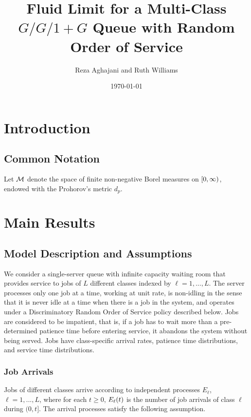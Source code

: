 \documentclass{article}
\theoremstyle{definition}
\numberwithin{equation}{section}
\begin{document}
\title{Fluid Limit for a Multi-Class $G/G/1+G$ Queue with Random Order of Service}
\date{\today}
\author{Reza Aghajani and Ruth Williams}

\maketitle

\tableofcontents


\section{Introduction}\label{sec_intro}

\subsection{Common Notation} \label{sec_notation}

Let $\mathcal{M}$ denote the space of finite non-negative Borel measures on $[0,\infty)$, endowed with the Prohorov's metric $d_p$.

\section{Main Results}


\subsection{Model Description and Assumptions}\label{sec_model}
We consider a single-server queue with infinite capacity waiting room that provides service to jobs of $L$ different classes indexed by $\ell=1,...,L$. The server processes only one job at a time, working at unit rate, is non-idling in the sense that it is never idle at a time when there is a job in the system, and operates under a Discriminatory Random Order of Service policy described below. Jobs are considered to be impatient, that is, if a job has to wait more than a pre-determined patience time before entering service, it abandons the system without being served. Jobs have class-specific arrival rates, patience time distributions, and service time distributions.



\subsubsection*{Job Arrivals}
Jobs of different classes arrive according to independent processes $E_\ell$, $\ell=1,...,L$, where for each $t\geq0$, $E_\ell(t)$ is the number of job arrivals of class $\ell$ during $(0,t]$. The arrival processes satisfy the following assumption.
\end{document}
